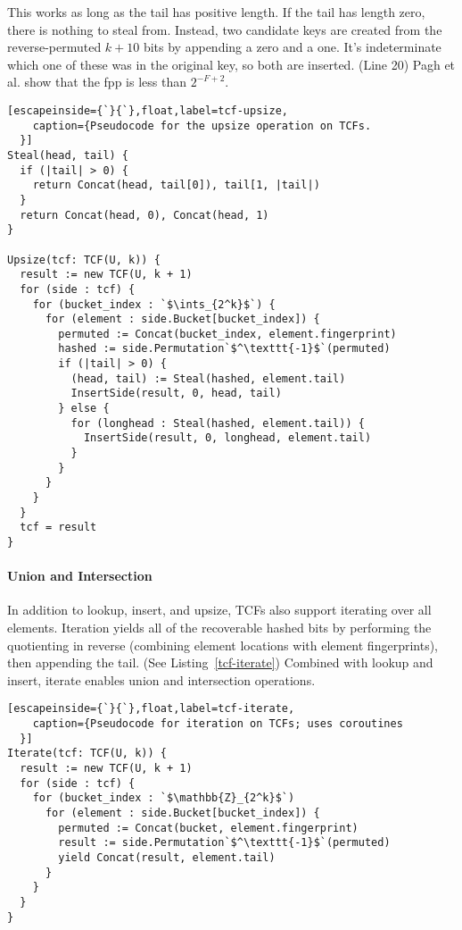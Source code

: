 \documentclass[sigconf, nonacm]{acmart}
\newcommand{\ints}{\mathbb{Z}}
\newcommand{\etal}{et al.}
\begin{document}
This works as long as the tail has positive length.
If the tail has length zero, there is nothing to steal from.
Instead, two candidate keys are created from the reverse-permuted $k+10$ bits by appending a zero and a one.
It's indeterminate which one of these was in the original key, so both are inserted. (Line 20)
Pagh \etal{} show that the fpp is less than $2^{-F+2}$.~\cite{psw}

\begin{lstlisting}[escapeinside={`}{`},float,label=tcf-upsize,
    caption={Pseudocode for the upsize operation on TCFs.
  }]
Steal(head, tail) {
  if (|tail| > 0) {
    return Concat(head, tail[0]), tail[1, |tail|)
  }
  return Concat(head, 0), Concat(head, 1)
}

Upsize(tcf: TCF(U, k)) {
  result := new TCF(U, k + 1)
  for (side : tcf) {
    for (bucket_index : `$\ints_{2^k}$`) {
      for (element : side.Bucket[bucket_index]) {
        permuted := Concat(bucket_index, element.fingerprint)
        hashed := side.Permutation`$^\texttt{-1}$`(permuted)
        if (|tail| > 0) {
          (head, tail) := Steal(hashed, element.tail)
          InsertSide(result, 0, head, tail)
        } else {
          for (longhead : Steal(hashed, element.tail)) {
            InsertSide(result, 0, longhead, element.tail)
          }
        }
      }
    }
  }
  tcf = result
}
\end{lstlisting}

\paragraph{Union and Intersection}
In addition to lookup, insert, and upsize, TCFs also support iterating over all elements.
Iteration yields all of the recoverable hashed bits by performing the quotienting in reverse (combining element locations with element fingerprints), then appending the tail. (See Listing~\ref{tcf-iterate})
Combined with lookup and insert, iterate enables union and intersection operations.



\begin{lstlisting}[escapeinside={`}{`},float,label=tcf-iterate,
    caption={Pseudocode for iteration on TCFs; uses coroutines
  }]
Iterate(tcf: TCF(U, k)) {
  result := new TCF(U, k + 1)
  for (side : tcf) {
    for (bucket_index : `$\mathbb{Z}_{2^k}$`)
      for (element : side.Bucket[bucket_index]) {
        permuted := Concat(bucket, element.fingerprint)
        result := side.Permutation`$^\texttt{-1}$`(permuted)
        yield Concat(result, element.tail)
      }
    }
  }
}
\end{lstlisting}
\end{document}
